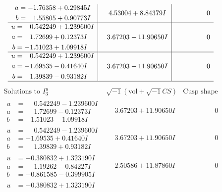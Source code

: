 \documentclass[1p]{elsarticle_modified}
\theoremstyle{definition}
\newcommand{\I}{\sqrt{-1}}
\begin{document}
$$\begin{array}{c|c|c}
\begin{aligned}
a &= -1.76358 + 0.29845 I \\
b &= \phantom{-}1.55805 + 0.90773 I\end{aligned}
 & \phantom{-}4.53004 + 8.84379 I & \phantom{-0.000000 } 0 \\ \hline\begin{aligned}
u &= \phantom{-}0.542249 + 1.239600 I \\
a &= \phantom{-}1.72699 + 0.12373 I \\
b &= -1.51023 + 1.09918 I\end{aligned}
 & \phantom{-}3.67203 - 11.90650 I & \phantom{-0.000000 } 0 \\ \hline\begin{aligned}
u &= \phantom{-}0.542249 + 1.239600 I \\
a &= -1.69535 - 0.41640 I \\
b &= \phantom{-}1.39839 - 0.93182 I\end{aligned}
 & \phantom{-}3.67203 - 11.90650 I & \phantom{-0.000000 } 0\\
 \hline 
 \end{array}$$\newpage$$\begin{array}{c|c|c}  
\text{Solutions to }I^u_{3}& \I (\text{vol} + \sqrt{-1}CS) & \text{Cusp shape}\\
 \hline 
\begin{aligned}
u &= \phantom{-}0.542249 - 1.239600 I \\
a &= \phantom{-}1.72699 - 0.12373 I \\
b &= -1.51023 - 1.09918 I\end{aligned}
 & \phantom{-}3.67203 + 11.90650 I & \phantom{-0.000000 } 0 \\ \hline\begin{aligned}
u &= \phantom{-}0.542249 - 1.239600 I \\
a &= -1.69535 + 0.41640 I \\
b &= \phantom{-}1.39839 + 0.93182 I\end{aligned}
 & \phantom{-}3.67203 + 11.90650 I & \phantom{-0.000000 } 0 \\ \hline\begin{aligned}
u &= -0.380832 + 1.323190 I \\
a &= \phantom{-}1.19262 - 0.84227 I \\
b &= -0.861585 - 0.399905 I\end{aligned}
 & \phantom{-}2.50586 + 11.87860 I & \phantom{-0.000000 } 0 \\ \hline\begin{aligned}
u &= -0.380832 + 1.323190 I \\

\end{aligned}
\end{array}$$
\end{document}
